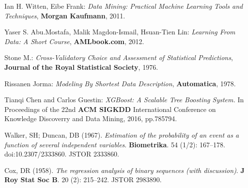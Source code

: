 \begin{thebibliography}{9}
Ian H. Witten, Eibe Frank: \textit{Data Mining: Practical Machine Learning Tools and Techniques}, \textbf{Morgan Kaufmann}, 2011.

Yaser S. Abu.Mostafa, Malik Magdon-Ismail, Hsuan-Tien Lin: \textit{Learning From Data: A Short Course}, \textbf{AMLbook.com}, 2012.

Stone M.: \textit{Cross-Validatory Choice and Assessment of Statistical Predictions}, \textbf{Journal of the Royal Statistical Society}, 1976. 

Rissanen Jorma: \textit{Modeling By Shortest Data Description}, \textbf{Automatica}, 1978.

Tianqi Chen and Carlos Guestin: \textit{XGBoost: A Scalable Tree Boosting System.} In Proceedings of the 22nd \textbf{ACM SIGKDD} International Conference on Knowledge Discoverry and Data Mining, 2016, pp.785794.

Walker, SH; Duncan, DB (1967). \textit{Estimation of the probability of an event as a function of several independent variables}. \textbf{Biometrika}. 54 (1/2): 167–178. doi:10.2307/2333860. JSTOR 2333860.

Cox, DR (1958). \textit{The regression analysis of binary sequences (with discussion)}. \textbf{J Roy Stat Soc B}. 20 (2): 215–242. JSTOR 2983890. 

\end{thebibliography}
